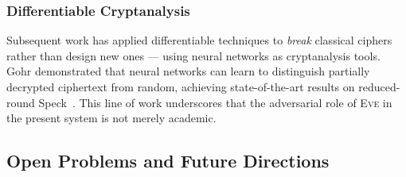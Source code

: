 \documentclass[12pt, a4paper]{article}
\newcommand{\eve}{\textsc{Eve}}
\begin{document}
\subsubsection*{Differentiable Cryptanalysis}

Subsequent work has applied differentiable techniques to
\emph{break} classical ciphers rather than design new ones ---
using neural networks as cryptanalysis tools. Gohr
demonstrated that neural networks can learn to distinguish
partially decrypted ciphertext from random, achieving
state-of-the-art results on reduced-round Speck~\cite{abadi2016learning}.
This line of work underscores that the adversarial role of \eve{}
in the present system is not merely academic.

\subsection{Open Problems and Future Directions}
\label{subsec:future}
\end{document}
